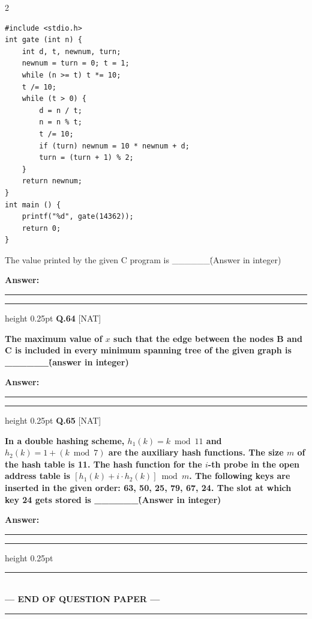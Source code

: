 \documentclass[a4paper,10pt,twoside]{article}
\begin{document}
\begin{multicols}{2}
{\begin{verbatim}
#include <stdio.h>
int gate (int n) {
    int d, t, newnum, turn;
    newnum = turn = 0; t = 1;
    while (n >= t) t *= 10;
    t /= 10;
    while (t > 0) {
        d = n / t;
        n = n % t;
        t /= 10;
        if (turn) newnum = 10 * newnum + d;
        turn = (turn + 1) % 2;
    }
    return newnum;
}
int main () {
    printf("%d", gate(14362));
    return 0;
}
\end{verbatim}
The value printed by the given C program is \_\_\_\_\_\_\. (Answer in integer) \par}
\par\vspace{3pt}\noindent\textbf{Answer:} \rule{3.2cm}{0.4pt}
\par\vspace{6pt}\hrule height 0.25pt\vspace{6pt}
\noindent\textbf{Q.64} \hfill {\footnotesize\textsf{[NAT]}}
\par\vspace{2pt}
{\bfseries The maximum value of $x$ such that the edge between the nodes B and C is included in every minimum spanning tree of the given graph is \_\_\_\_\_\_\. (answer in integer) \par}
\par\vspace{3pt}\noindent\textbf{Answer:} \rule{3.2cm}{0.4pt}
\par\vspace{6pt}\hrule height 0.25pt\vspace{6pt}
\noindent\textbf{Q.65} \hfill {\footnotesize\textsf{[NAT]}}
\par\vspace{2pt}
{\bfseries In a double hashing scheme, $h_1(k) = k \bmod 11$ and $h_2(k) = 1 + (k \bmod 7)$ are the auxiliary hash functions. The size $m$ of the hash table is 11. The hash function for the $i$-th probe in the open address table is $[h_1(k) + i \cdot h_2(k)] \bmod m$. The following keys are inserted in the given order: 63, 50, 25, 79, 67, 24.
The slot at which key 24 gets stored is \_\_\_\_\_\_\. (Answer in integer) \par}
\par\vspace{3pt}\noindent\textbf{Answer:} \rule{3.2cm}{0.4pt}
\par\vspace{6pt}\hrule height 0.25pt\vspace{6pt}
\end{multicols}
\vspace{8pt}
\begin{center}
\rule{0.35\linewidth}{0.5pt}\\[2pt]
\textbf{\small --- END OF QUESTION PAPER ---}\\[-8pt]
\rule{0.35\linewidth}{0.5pt}
\end{center}
\vspace{10pt}
\end{document}
